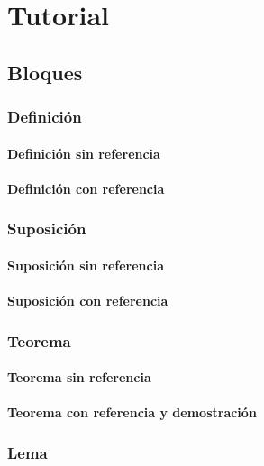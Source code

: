 \chapter{Tutorial}
\section{Bloques}
\subsection{Definición}
\subsubsection{Definición sin referencia }
\subsubsection{Definición con referencia}

\subsection{Suposición}
\subsubsection{Suposición sin referencia}
\supos{}{\lipsum[1]}
\subsubsection{Suposición con referencia}
\suposr{}{}{\lipsum[1]}
\newpage

\subsection{Teorema}
\subsubsection{Teorema sin referencia}
\teo{}{\lipsum[1]}
\subsubsection{Teorema con referencia y demostración}
\teor{}{}{\lipsum[1]}
\begin{teop}
    \lipsum[1]
\end{teop}

\subsection{Lema}
